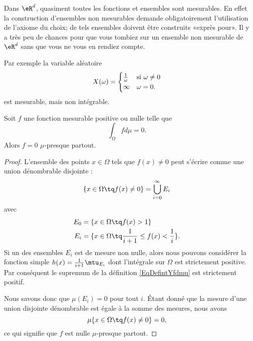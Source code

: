 \begin{remark}
    Dans \( \eR^d\), quasiment toutes les fonctions et ensembles sont mesurables. En effet la construction d'ensembles non mesurables demande obligatoirement l'utilisation de l'axiome du choix; de tels ensembles doivent être construits «exprès pour». Il y a très peu de chances pour que vous tombiez sur un ensemble non mesurable de \( \eR^d\) sans que vous ne vous en rendiez compte.

    Par exemple la variable aléatoire 
    \begin{equation}
        X(\omega)=\begin{cases}
            \frac{1}{ \omega }    &   \text{si $ \omega\neq 0$}\\
            \infty    &    \text{$\omega=0$}.
        \end{cases}
    \end{equation}
    est mesurable, mais non intégrable.
\end{remark}

\begin{lemma}   \label{Lemfobnwt}
    Soit \( f\) une fonction mesurable positive ou nulle telle que
    \begin{equation}
        \int_{\Omega}fd\mu=0.
    \end{equation}
    Alors \( f=0\) \( \mu\)-presque partout.
\end{lemma}

\begin{proof}
    L'ensemble des points \( x\in\Omega\) tels que \( f(x)\neq 0\) peut s'écrire comme une union dénombrable disjointe :
    \begin{equation}
        \{ x\in\Omega\tq f(x)\neq 0 \}=\bigcup_{i=0}^{\infty}E_i
    \end{equation}
    avec
    \begin{subequations}
        \begin{align}
            E_0&=\{ x\in\Omega\tq f(x)>1 \}\\
            E_i&=\{ x\in\Omega\tq \frac{1}{ i+1 }\leq f(x)<\frac{1}{ i } \}.
        \end{align}
    \end{subequations}
    Si un des ensembles \( E_i\) est de mesure non nulle, alors nous pouvons considérer la fonction simple \( h(x)=\frac{1}{ i+1 }\mtu_{E_i}\) dont l'intégrale sur \( \Omega\) est strictement positive. Par conséquent le supremum de la définition \eqref{EqDefintYfdmu} est strictement positif.

    Nous savons donc que \( \mu(E_i)=0\) pour tout \( i\). Étant donné que la mesure d'une union disjointe dénombrable est égale à la somme des mesures, nous avons
    \begin{equation}
        \mu\{ x\in\Omega\tq f(x)\neq 0 \}=0,
    \end{equation}
    ce qui signifie que \( f\) est nulle \( \mu\)-presque partout.
\end{proof}

